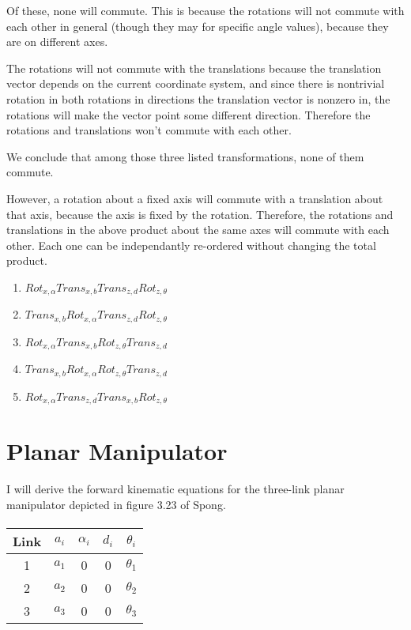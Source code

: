 \documentclass{article}
\begin{document}
Of these, none will commute.
This is because the rotations will not commute with
	each other in general (though they may for specific
	angle values), because they are on different axes.

The rotations will not commute with the translations because
	the translation vector depends on the current coordinate
	system, and since there is nontrivial rotation in both 
	rotations in directions the translation vector is nonzero in,
	the rotations will make the vector point some different direction.
Therefore the rotations and translations won't commute with each other.

We conclude that among those three listed transformations,
	none of them commute.

However, a rotation about a fixed axis will commute with a translation
	about that axis, because the axis is fixed by the rotation.
Therefore, the rotations and translations in the above product about the
	same axes will commute with each other.
Each one can be independantly re-ordered without changing the total product.

\begin{enumerate}
\item $Rot_{x,\alpha} Trans_{x,b} Trans_{z,d} Rot_{z, \theta}$
\item $ Trans_{x,b} Rot_{x,\alpha}Trans_{z,d} Rot_{z, \theta}$
\item $Rot_{x,\alpha} Trans_{x,b} Rot_{z, \theta} Trans_{z,d} $
\item $Trans_{x,b}Rot_{x,\alpha} Rot_{z, \theta} Trans_{z,d} $
\item $Rot_{x,\alpha}Trans_{z,d} Trans_{x,b}  Rot_{z, \theta}$
\end{enumerate}

\section{Planar Manipulator}

I will derive the forward kinematic equations for the three-link planar
	manipulator depicted in figure 3.23 of Spong.

\paragraph{}
\begin{tabular}{|c|c|c|c|c|}
\hline
Link & $a_i$ & $\alpha_i$ & $d_i$ & $\theta_i$ \\
\hline
1 & $a_1$ & 0 & 0 & $\theta_1$ \\
2 & $a_2$ & 0 & 0 & $\theta_2$ \\
3 & $a_3$ & 0 & 0 & $\theta_3$ \\
\hline
\end{tabular}
\end{document}
